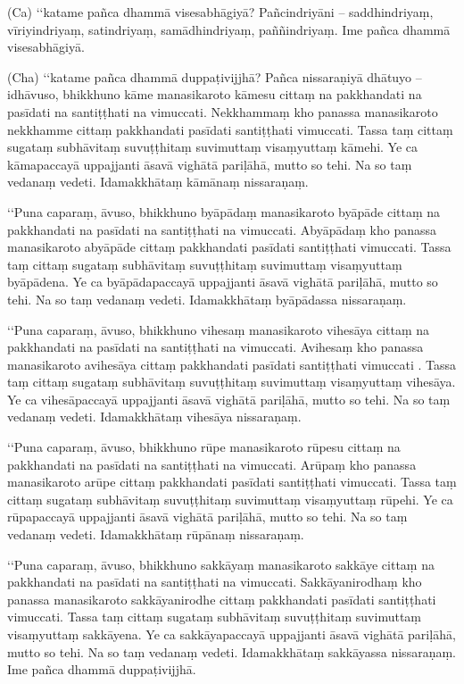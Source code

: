 (Ca) ‘‘katame pañca dhammā visesabhāgiyā? Pañcindriyāni – saddhindriyaṃ, vīriyindriyaṃ, satindriyaṃ, samādhindriyaṃ, paññindriyaṃ. Ime pañca dhammā visesabhāgiyā.

(Cha) ‘‘katame pañca dhammā duppaṭivijjhā? Pañca nissaraṇiyā dhātuyo – idhāvuso, bhikkhuno kāme manasikaroto kāmesu cittaṃ na pakkhandati na pasīdati na santiṭṭhati na vimuccati. Nekkhammaṃ kho panassa manasikaroto nekkhamme cittaṃ pakkhandati pasīdati santiṭṭhati vimuccati. Tassa taṃ cittaṃ sugataṃ subhāvitaṃ suvuṭṭhitaṃ suvimuttaṃ visaṃyuttaṃ kāmehi. Ye ca kāmapaccayā uppajjanti āsavā vighātā pariḷāhā, mutto so tehi. Na so taṃ vedanaṃ vedeti. Idamakkhātaṃ kāmānaṃ nissaraṇaṃ.

‘‘Puna caparaṃ, āvuso, bhikkhuno byāpādaṃ manasikaroto byāpāde cittaṃ na pakkhandati na pasīdati na santiṭṭhati na vimuccati. Abyāpādaṃ kho panassa manasikaroto abyāpāde cittaṃ pakkhandati pasīdati santiṭṭhati vimuccati. Tassa taṃ cittaṃ sugataṃ subhāvitaṃ suvuṭṭhitaṃ suvimuttaṃ visaṃyuttaṃ byāpādena. Ye ca byāpādapaccayā uppajjanti āsavā vighātā pariḷāhā, mutto so tehi. Na so taṃ vedanaṃ vedeti. Idamakkhātaṃ byāpādassa nissaraṇaṃ.

‘‘Puna caparaṃ, āvuso, bhikkhuno vihesaṃ manasikaroto vihesāya cittaṃ na pakkhandati na pasīdati na santiṭṭhati na vimuccati. Avihesaṃ kho panassa manasikaroto avihesāya cittaṃ pakkhandati pasīdati santiṭṭhati vimuccati . Tassa taṃ cittaṃ sugataṃ subhāvitaṃ suvuṭṭhitaṃ suvimuttaṃ visaṃyuttaṃ vihesāya. Ye ca vihesāpaccayā uppajjanti āsavā vighātā pariḷāhā, mutto so tehi. Na so taṃ vedanaṃ vedeti. Idamakkhātaṃ vihesāya nissaraṇaṃ.

‘‘Puna caparaṃ, āvuso, bhikkhuno rūpe manasikaroto rūpesu cittaṃ na pakkhandati na pasīdati na santiṭṭhati na vimuccati. Arūpaṃ kho panassa manasikaroto arūpe cittaṃ pakkhandati pasīdati santiṭṭhati vimuccati. Tassa taṃ cittaṃ sugataṃ subhāvitaṃ suvuṭṭhitaṃ suvimuttaṃ visaṃyuttaṃ rūpehi. Ye ca rūpapaccayā uppajjanti āsavā vighātā pariḷāhā, mutto so tehi. Na so taṃ vedanaṃ vedeti. Idamakkhātaṃ rūpānaṃ nissaraṇaṃ.

‘‘Puna caparaṃ, āvuso, bhikkhuno sakkāyaṃ manasikaroto sakkāye cittaṃ na pakkhandati na pasīdati na santiṭṭhati na vimuccati. Sakkāyanirodhaṃ kho panassa manasikaroto sakkāyanirodhe cittaṃ pakkhandati pasīdati santiṭṭhati vimuccati. Tassa taṃ cittaṃ sugataṃ subhāvitaṃ suvuṭṭhitaṃ suvimuttaṃ visaṃyuttaṃ sakkāyena. Ye ca sakkāyapaccayā uppajjanti āsavā vighātā pariḷāhā, mutto so tehi. Na so taṃ vedanaṃ vedeti. Idamakkhātaṃ sakkāyassa nissaraṇaṃ. Ime pañca dhammā duppaṭivijjhā.

